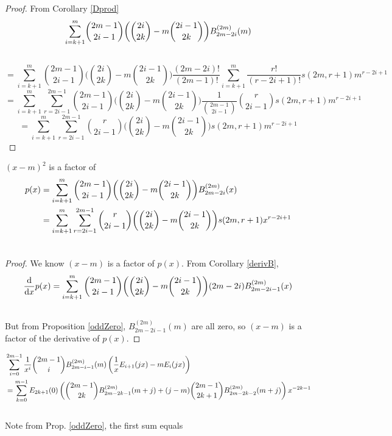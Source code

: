 \documentclass[fleqn,a4paper,9pt]{article}
\begin{document}
\begin{flushleft}
\begin{corollary}
\end{corollary}
\begin{proof}
From Corollary \ref{Dprod}
\begin{align}
\sum_{i=k+1}^m& \binom{2m-1}{2i-1}\biggl(\binom{2i}{2k}-m\binom{2i-1}{2k}\biggr)B_{2m-2i}^{(2m)}(m)\\\notag
\end{align}
$$=\sum_{i=k+1}^m \binom{2m-1}{2i-1}\biggl(\binom{2i}{2k}-m\binom{2i-1}{2k}\biggr)\frac{(2m-2i)!}{(2m-1)!}\sum_{i=k+1}^m\frac{r!}{(r-2i+1)!}s(2m,r+1) m^{r-2i+1}$$
$$=\sum_{i=k+1}^m \sum_{r=2i-1}^{2m-1}\binom{2m-1}{2i-1}\biggl(\binom{2i}{2k}-m\binom{2i-1}{2k}\biggr)\frac{1}{\binom{2m-1}{2i-1}}\binom{r}{2i-1}s(2m,r+1) m^{r-2i+1}$$
$$=\sum_{i=k+1}^m \sum_{r=2i-1}^{2m-1}\binom{r}{2i-1}\biggl(\binom{2i}{2k}-m\binom{2i-1}{2k}\biggr)s(2m,r+1) m^{r-2i+1}$$
\end{proof}
\begin{corollary}
$(x-m)^2$ is a factor of
\begin{align}
p(x)&=\sum_{i=k+1}^m \binom{2m-1}{2i-1}\biggl(\binom{2i}{2k}-m\binom{2i-1}{2k}\biggr)B_{2m-2i}^{(2m)}(x)\\\notag
&=\sum_{i=k+1}^m\sum_{r=2i-1}^{2m-1} \binom{r}{2i-1}\biggl(\binom{2i}{2k}-m\binom{2i-1}{2k}\biggr)s(2m,r+1)x^{r-2i+1}\\\notag
\end{align}
\end{corollary}
\begin{proof}
We know $(x-m)$ is a factor of $p(x)$. From Corollary \ref{derivB}, 
\begin{align}
\frac{  \mathrm{  d  }   }{\mathrm{d}x  } p(x)&=\sum_{i=k+1}^m \binom{2m-1}{2i-1}\biggl(\binom{2i}{2k}-m\binom{2i-1}{2k}\biggr)(2m-2i)B_{2m-2i-1}^{(2m)}(x)\\\notag
\end{align}
But from Proposition \ref{oddZero}, $B_{2m-2i-1}^{(2m)}(m)$ are all zero, so $(x-m)$ is a factor of the derivative of $p(x)$.
\end{proof}
\begin{lemma}\label{prepprep}
\begin{align}
&\sum_{i=0}^{2m-1}\frac{1}{x^i}\binom{2m-1}{i}B_{2m-i-1}^{(2m)}(m)\left(\frac{1}{x}E_{i+1}(jx)-mE_i(jx)\right)\\\notag
&=\sum_{k=0}^{m-1}E_{2k+1}(0)\left(\binom{2m-1}{2k}B_{2m-2k-1}^{(2m)}(m+j)+(j-m)\binom{2m-1}{2k+1}B_{2m-2k-2}^{(2m)}(m+j)\right)x^{-2k-1}\\\notag
\end{align}
Note from Prop. \ref{oddZero}, the first sum equals

\end{lemma}
\end{flushleft}
\end{document}
